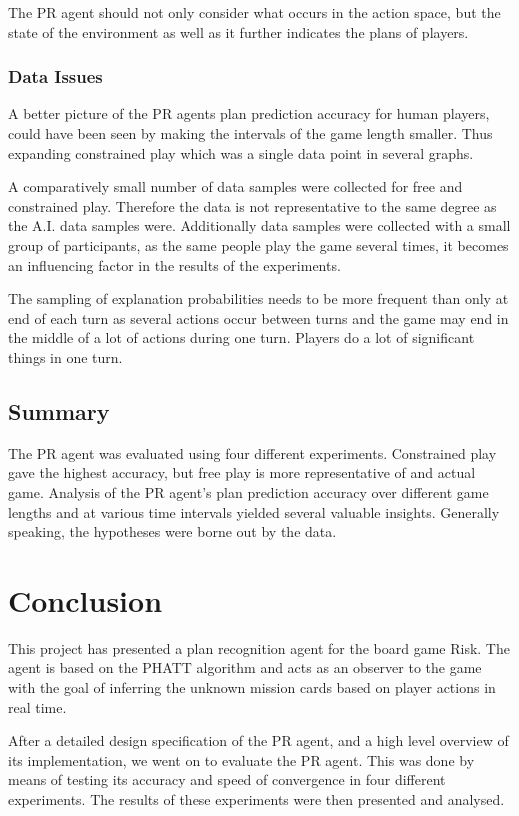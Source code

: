 \documentclass[parskip]{cs4rep}
\begin{document}
The PR agent should not only consider what occurs in the action space, but the state of the environment as well as it further indicates the plans of players.

\subsection{Data Issues}

A better picture of the PR agents plan prediction accuracy for human players, could have been seen by making the intervals of the game length smaller. Thus expanding constrained play which was a single data point in several graphs.

A comparatively small number of data samples were collected for free and constrained play. Therefore the data is not representative to the same degree as the A.I. data samples were. Additionally data samples were collected with a small group of participants, as the same people play the game several times, it becomes an influencing factor in the results of the experiments.

The sampling of explanation probabilities needs to be more frequent than only at end of each turn as several actions occur between turns and the game may end in the middle of a lot of actions during one turn. Players do a lot of significant things in one turn.

\section{Summary}

The PR agent was evaluated using four different experiments. Constrained play gave the highest accuracy, but free play is more representative of and actual game. Analysis of the PR agent's plan prediction accuracy over different game lengths and at various time intervals yielded several valuable insights. Generally speaking, the hypotheses were borne out by the data. 

\chapter{Conclusion}

This project has presented a plan recognition agent for the board game Risk. The agent is based on the PHATT algorithm \cite{Geib:2009:PPR:1550966.1551246} and acts as an observer to the game with the goal of inferring the unknown mission cards based on player actions in real time. 

After a detailed design specification of the PR agent, and a high level overview of its implementation, we went on to evaluate the PR agent. This was done by means of testing its accuracy and speed of convergence in four different experiments. The results of these experiments were then presented and analysed.
\end{document}
